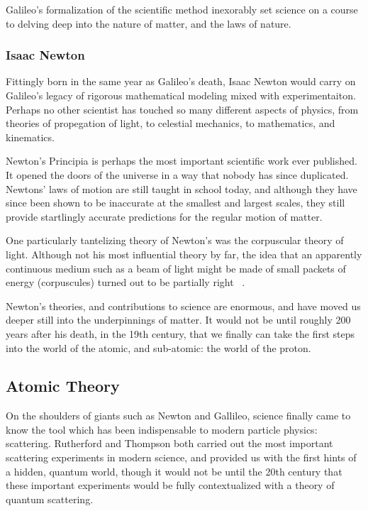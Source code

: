 Galileo's formalization of the scientific method inexorably set science on a
course to delving deep into the nature of matter, and the laws of nature.

\subsubsection{Isaac Newton}
Fittingly born in the same year as Galileo's death, Isaac Newton would carry on
Galileo's legacy of rigorous mathematical modeling mixed with experimentaiton.
Perhaps no other scientist has touched so many different aspects of physics,
from theories of propegation of light, to celestial mechanics, to mathematics,
and kinematics.

Newton's Principia is perhaps the most important scientific work ever published.
It opened the doors of the universe in a way that nobody has since duplicated.
Newtons' laws of motion are still taught in school today, and although they have
since been shown to be inaccurate at the smallest and largest scales, they still
provide startlingly accurate predictions for the regular motion of matter.

One particularly tantelizing theory of Newton's was the corpuscular theory of
light. Although not his most influential theory by far, the idea that an
apparently continuous medium such as a beam of light might be made of small
packets of energy (corpuscules) turned out to be partially right ~\needcite{}.

Newton's theories, and contributions to science are enormous, and have moved us
deeper still into the underpinnings of matter. It would not be until roughly 200
years after his death, in the 19th century, that we finally can take the first
steps into the world of the atomic, and sub-atomic: the world of the proton. 

\clearpage
\subsection{Atomic Theory}

On the shoulders of giants such as Newton and Gallileo, science finally came to
know the tool which has been indispensable to modern particle physics:
scattering. Rutherford and Thompson both carried out the most important
scattering experiments in modern science, and provided us with the first hints
of a hidden, quantum world, though it would not be until the 20th century that
these important experiments would be fully contextualized with a theory of
quantum scattering.

